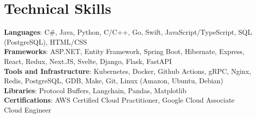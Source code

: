 \documentclass[letterpaper,11pt]{article}
\begin{document}
%
\section{Technical Skills}
 \begin{itemize}[leftmargin=0.15in, label={}]
    \small{\item{
     \textbf{Languages}{: C\#, Java, Python, C/C++, Go, Swift, JavaScript/TypeScript, SQL (PostgreSQL), HTML/CSS} \\
     \textbf{Frameworks}{: ASP.NET, Entity Framework, Spring Boot, Hibernate, Express, React, Redux, Next.JS, Svelte, Django, Flask, FastAPI } \\
         \textbf{Tools and Infrastructure}{: Kubernetes, Docker, Github Actions, gRPC, Nginx, Redis, PostgreSQL, GDB, Make, Git, Linux (Amazon, Ubuntu, Debian) } \\
     \textbf{Libraries}{: Protocol Buffers, Langchain, Pandas, Matplotlib } \\
     \textbf{Certifications}{: AWS Certified Cloud Practitioner, Google Cloud Associate Cloud Engineer}
    }}
 \end{itemize}


\end{document}
